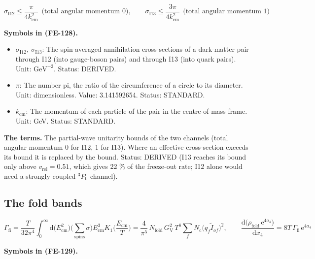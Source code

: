 \documentclass[
  10pt,
]{article}
\providecommand{\tightlist}{%
  \setlength{\itemsep}{0pt}\setlength{\parskip}{0pt}}
\begin{document}
\[
\sigma_{\mathrm{I12}} \le \frac{\pi}{4k_{\mathrm{cm}}^2}\ \ \text{(total angular momentum 0)},\qquad
\sigma_{\mathrm{I13}} \le \frac{3\pi}{4k_{\mathrm{cm}}^2}\ \ \text{(total angular momentum 1)} \tag{FE-128}
\]

\textbf{Symbols in (FE-128).}

\begin{itemize}
\tightlist
\item
  \(\sigma_{\mathrm{I12}},\ \sigma_{\mathrm{I13}}\): The spin-averaged
  annihilation cross-sections of a dark-matter pair through I12 (into
  gauge-boson pairs) and through I13 (into quark pairs). Unit:
  \(\mathrm{GeV}^{-2}\). Status: DERIVED.
\item
  \(\pi\): The number pi, the ratio of the circumference of a circle to
  its diameter. Unit: dimensionless. Value: 3.141592654. Status:
  STANDARD.
\item
  \(k_{\mathrm{cm}}\): The momentum of each particle of the pair in the
  centre-of-mass frame. Unit: GeV. Status: STANDARD.
\end{itemize}

\textbf{The terms.} The partial-wave unitarity bounds of the two
channels (total angular momentum 0 for I12, 1 for I13). Where an
effective cross-section exceeds its bound it is replaced by the bound.
Status: DERIVED (I13 reaches its bound only above
\(v_{\mathrm{rel}} = 0.51\), which gives 22 \% of the freeze-out rate;
I12 alone would need a strongly coupled \(^3P_0\) channel).

\hypertarget{the-fold-bands}{%
\subsection{The fold bands}\label{the-fold-bands}}

\[
\Gamma_{\mathrm{fi}} =
 \frac{T}{32\pi^4}\int_0^\infty\mathrm{d}\big(E_{\mathrm{cm}}^2\big)\Big(\sum_{\text{spins}}\sigma
 \Big)E_{\mathrm{cm}}^3
 K_1\Big(\frac{E_{\mathrm{cm}}}{T}\Big) =
 \frac{4}{\pi^5}\,N_{\mathrm{fold}}\,G_{\mathrm{V}}^2\,T^8\sum_fN_{\mathrm{c}}\big(q_f\tilde I_{of}\big)^2,
\qquad \frac{\mathrm{d}\big(\rho_{\mathrm{fold}}\,\mathrm{e}^{4a_4}\big)}{\mathrm{d}x_4} =
 8T\,\Gamma_{\mathrm{fi}}\,\mathrm{e}^{4a_4} \tag{FE-129}
\]

\textbf{Symbols in (FE-129).}
\end{document}
